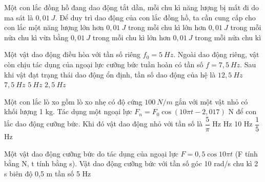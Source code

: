 \setcounter{paragraph}{0}
\PhanI
\begin{ex}
Một con lắc đồng hồ đang dao động tắt dần, mỗi chu kì năng lượng bị mất đi do ma sát là $0,01\ J$. Để duy trì dao động của con lắc đồng hồ, ta cần cung cấp cho con lắc một năng lượng
\choice
{lớn hơn $0,01\ J$ trong mỗi chu kì}
{lớn hơn $0,01\ J$ trong mỗi nửa chu kì}
{\True vừa bằng $0,01\ J$ trong mỗi chu kì}
{lớn hơn $0,01\ J$ trong mỗi nửa chu kì}
\loigiai{}
\end{ex}
\begin{ex}
Một vật dao động điều hòa với tần số riêng $f_0 = 5\ Hz$. Ngoài dao động riêng, vật còn chịu tác dụng của ngoại lực cưỡng bức tuần hoàn có tần số $f = 7,5\ Hz$. Sau khi vật đạt trạng thái dao động ổn định, tần số dao động của hệ là
\choice
{$12,5\ Hz$}
{\True $7,5\ Hz$}
{$5\ Hz$}
{$2,5\ Hz$}
\loigiai{}
\end{ex}
\begin{ex}%
Một con lắc lò xo gồm lò xo nhẹ có độ cứng $100\ N/m$ gắn với một vật nhỏ có khối lượng 1 kg. Tác dụng một ngoại lực $F_n=F_0\cos \left({10\pi t-2,017}\right)$ N để con lắc dao động cưỡng bức. Khi đó vật dao động nhỏ với tần số là
\choice
{$\dfrac{5}{\pi }$ Hz}
{ Hz}
{10 Hz}
{$\dfrac{1}{5}$ Hz}
\end{ex} 
\begin{ex}%
Một vật dao động cưỡng bức do tác dụng của ngoại lực $F = 0,5\cos 10\pi t$ (F tính bằng N, t tính bằng s). Vật dao động cưỡng bức với
\choice
{tần số góc 10 rad/s}
{chu kì 2 s}
{biên độ 0,5 m}
{\True tần số 5 Hz}
\end{ex} 

